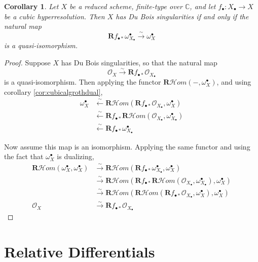 \documentclass{amsart}
\newtheorem{cor}[theorem]{Corollary}
\theoremstyle{definition}
\newcommand{\cHom}{\mathcal{H} \textit{om}}
\newcommand{\CC}{\mathbb{C}}
\newcommand{\OO}{\mathcal{O}}
\newcommand{\bR}{\textbf{R}}
\begin{document}
\begin{cor}
	Let $X$ be a reduced scheme, finite-type over $\CC$, and let $f_\bullet : X_\bullet \rightarrow X$ be a cubic hyperresolution.
	Then $X$ has Du Bois singularities if and only if the natural map
	\[
		\bR f_{\bullet *} \omega^\bullet_{X_\bullet} \xrightarrow{\sim} \omega^\bullet_X
	\]
	is a quasi-isomorphism.
\end{cor}
\begin{proof}
	Suppose $X$ has Du Bois singularities, so that the natural map
	\[
		\OO_X \xrightarrow{\sim} \bR f_{\bullet *} \OO_{X_\bullet}
	\]
	is a quasi-isomorphism.
	Then applying the functor $\bR \cHom(-,\omega_X^\bullet)$, and using corollary \ref{cor:cubicalgrothdual},
	\begin{align*}
		\omega_X^\bullet &\xleftarrow{\sim} \bR \cHom(\bR f_{\bullet *} \OO_{X_\bullet}, \omega_X^\bullet) \\
		&\xleftarrow{\sim} \bR f_{\bullet *} \bR \cHom(\OO_{X_\bullet}, \omega_{X_\bullet}^\bullet) \\
		&\xleftarrow{\sim} \bR f_{\bullet *} \omega_{X_\bullet}^\bullet
	\end{align*}
	
	Now assume this map is an isomorphism.
	Applying the same functor and using the fact that $\omega_X^\bullet$ is dualizing,
	\begin{align*}
		\bR \cHom(\omega_X^\bullet, \omega_X^\bullet) &\xrightarrow{\sim} \bR \cHom(\bR f_{\bullet *} \omega_{X_\bullet}^\bullet, \omega_X^\bullet) \\
		&\xrightarrow{\sim} \bR \cHom(\bR f_{\bullet *} \bR \cHom(\OO_{X_\bullet}, \omega_{X_\bullet}^\bullet), \omega_{X}^\bullet) \\
		&\xrightarrow{\sim} \bR \cHom(\bR \cHom(\bR f_{\bullet *} \OO_{X_\bullet}, \omega_X^\bullet), \omega_X^\bullet) \\
		\OO_X &\xrightarrow{\sim} \bR f_{\bullet *} \OO_{X_\bullet}
	\end{align*}
\end{proof}

\section{Relative Differentials}
\end{document}
